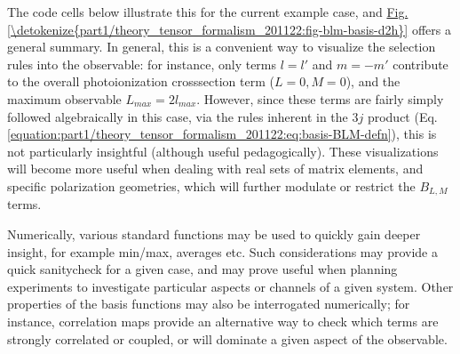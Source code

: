 \documentclass[letterpaper,table,10pt,english]{jupyterBook}
\begin{document}
\sphinxAtStartPar
The code cells below illustrate this for the current example case, and \hyperref[\detokenize{part1/theory_tensor_formalism_201122:fig-blm-basis-d2h}]{Fig.\@ \ref{\detokenize{part1/theory_tensor_formalism_201122:fig-blm-basis-d2h}}} offers a general summary. In general, this is a convenient way to visualize the selection rules into the observable: for instance, only terms \(l=l'\) and \(m=-m'\) contribute to the overall photoionization cross\sphinxhyphen{}section term (\(L=0, M=0\)), and the maximum observable \(L_{max}=2l_{max}\). However, since these terms are fairly simply followed algebraically in this case, via the rules inherent in the \(3j\) product (Eq. \eqref{equation:part1/theory_tensor_formalism_201122:eq:basis-BLM-defn}), this is not particularly insightful (although useful pedagogically). These visualizations will become more useful when dealing with real sets of matrix elements, and specific polarization geometries, which will further modulate or restrict the \(B_{L,M}\) terms.

\sphinxAtStartPar
Numerically, various standard functions may be used to quickly gain deeper insight, for example min/max, averages etc. Such considerations may provide a quick sanity\sphinxhyphen{}check for a given case, and may prove useful when planning experiments to investigate particular aspects or channels of a given system. Other properties of the basis functions may also be interrogated numerically; for instance, correlation maps provide an alternative way to check which terms are strongly correlated or coupled, or will dominate a given aspect of the observable.
\end{document}

